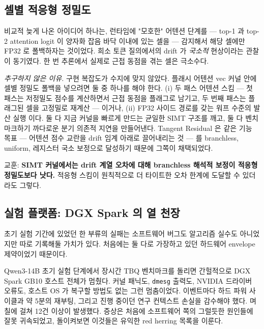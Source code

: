 \documentclass[10pt,twocolumn]{article}
\begin{document}
\subsection{셀별 적응형 정밀도}

비교적 늦게 나온 아이디어 하나는, 런타임에 "모호한" 어텐션 단계를 --- top-1 과 top-2 attention logit 이 양자화 잡음 바닥 이내에 있는 셀을 --- 감지해서 해당 셀에만 FP32 로 폴백하자는 것이었다. 희소 토큰 질의에서의 drift 가 \emph{국소적} 현상이라는 관찰이 동기였다. 한 번 추론에서 실제로 근접 동점을 겪는 셀은 극소수다.

\emph{추구하지 않은 이유.} 구현 복잡도가 수지에 맞지 않았다. 플래시 어텐션 vec 커널 안에 셀별 정밀도 폴백을 넣으려면 둘 중 하나를 해야 한다. (i) 두 패스 어텐션 스킴 --- 첫 패스는 저정밀도 점수를 계산하면서 근접 동점을 플래그로 남기고, 두 번째 패스는 플래그된 셀을 고정밀로 재계산 --- 이거나, (ii) FP32 사이드 경로를 갖는 워프 수준의 발산 실행 이다. 둘 다 지금 커널을 빠르게 만드는 균일한 SIMT 구조를 깨고, 둘 다 벤치마크하기 까다로운 분기 의존적 지연을 만들어낸다. Tangent Residual 은 같은 기능 목표 --- 어텐션 점수 교란을 drift 임계 아래로 끌어내리는 것 --- 를 branchless, uniform, 레지스터 국소 보정으로 달성하기 때문에 그쪽이 채택되었다.

교훈: \textbf{SIMT 커널에서는 drift 계열 오차에 대해 branchless 해석적 보정이 적응형 정밀도보다 낫다.} 적응형 스킴이 원칙적으로 더 타이트한 오차 한계에 도달할 수 있더라도 그렇다.

\subsection{실험 플랫폼: DGX Spark 의 열 천장}

초기 실험 기간에 있었던 한 부류의 실패는 소프트웨어 버그도 알고리즘 실수도 아니었지만 따로 기록해둘 가치가 있다. 처음에는 둘 다로 가장하고 있던 하드웨어 envelope 제약이었기 때문이다.

Qwen3-14B 초기 실험 단계에서 장시간 TBQ 벤치마크를 돌리면 간헐적으로 DGX Spark GB10 호스트 전체가 멈췄다. 커널 패닉도, \texttt{dmesg} 출력도, NVIDIA 드라이버 오류도, 호스트 OS 가 복구할 방법도 없는 그런 멈춤이었다. 이벤트마다 하드 파워 사이클과 약 5분의 재부팅, 그리고 진행 중이던 연구 컨텍스트 손실을 감수해야 했다. 며칠에 걸쳐 12건 이상이 발생했다. 증상은 처음에 소프트웨어 쪽의 그럴듯한 원인들에 잘못 귀속되었고, 돌이켜보면 이것들은 유익한 red herring 목록을 이룬다.
\end{document}
